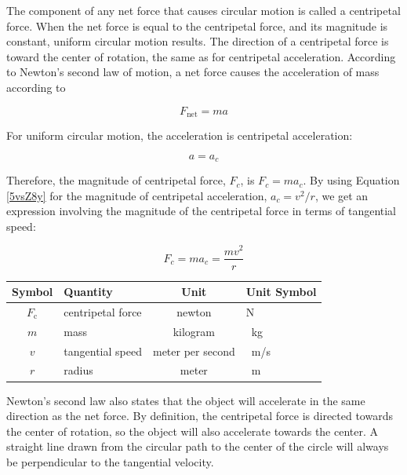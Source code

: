 \documentclass[main-physics.tex]{subfiles}
\begin{document}
The component of any net force that causes circular motion is called a \gls{centripetal force}. When the net force is equal to the centripetal force, and its magnitude is constant, uniform circular motion results. The direction of a centripetal force is toward the center of rotation, the same as for centripetal acceleration. According to Newton's second law of motion, a net force causes the acceleration of mass according to 

\begin{equation*}
    F_{\text{net}} = ma
\end{equation*}

For uniform circular motion, the acceleration is centripetal acceleration: 

\begin{equation*}
    a = a_c
\end{equation*}

Therefore, the magnitude of centripetal force, $F_c$, is $F_c = m a_c$. By using Equation \eqref{5vsZ8y} for the magnitude of centripetal acceleration, $a_c = v^2/r$, we get an expression involving the magnitude of the centripetal force in terms of tangential speed:

\begin{equation} \label{4H9EJq}
    F_c = m a_c = \frac{m v^2}{r}
\end{equation}

\begin{center}
    \begin{tabular}{cl|cl}
    \hline
    \textbf{Symbol} & \textbf{Quantity} & \textbf{Unit} & \textbf{Unit Symbol}  \\
    \hline\hline
    \rule{0pt}{2.5ex}
        $F_{\text{c}}$ & centripetal force & newton & N\\
        $m$ & mass & kilogram & \SI{}{kg}\\
        $v$ & tangential speed & meter per second & \SI{}{m/s} \\
        $r$ & radius & meter & \SI{}{m}\\
    \hline
    \end{tabular}
\end{center}

Newton's second law also states that the object will accelerate in the same direction as the net force. By definition, the centripetal force is directed towards the center of rotation, so the object will also accelerate towards the center. A straight line drawn from the circular path to the center of the circle will always be perpendicular to the tangential velocity. 
\end{document}
